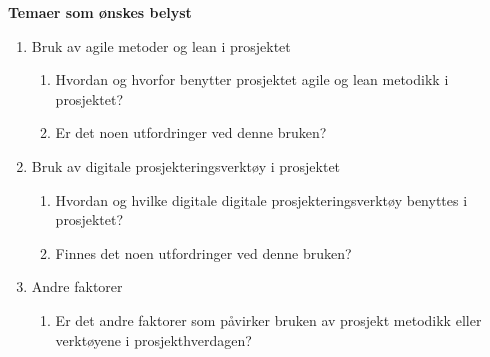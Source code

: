 \noindent\textbf{Temaer som ønskes belyst}
\begin{enumerate}
    \item Bruk av agile metoder og lean i prosjektet
    \begin{enumerate}
        \item Hvordan og hvorfor benytter prosjektet agile og lean metodikk i prosjektet?
        \item Er det noen utfordringer ved denne bruken?
    \end{enumerate}
    \item Bruk av digitale prosjekteringsverktøy i prosjektet
    \begin{enumerate}
        \item Hvordan og hvilke digitale digitale prosjekteringsverktøy benyttes i\\ prosjektet?
        \item Finnes det noen utfordringer ved denne bruken?
    \end{enumerate}
    \item Andre faktorer
    \begin{enumerate}
        \item Er det andre faktorer som påvirker bruken av prosjekt metodikk eller\\ verktøyene i prosjekthverdagen?
    \end{enumerate}
\end{enumerate}